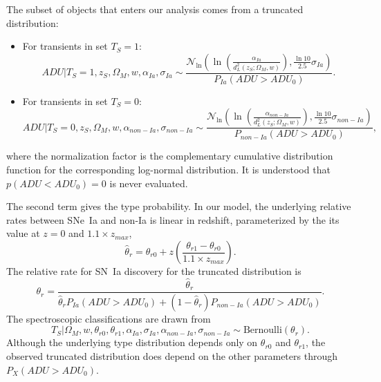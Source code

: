 \documentclass[preprint]{aastex}
\begin{document}
The subset of objects that enters our analysis comes from a truncated distribution:
\begin{itemize}
\item For transients in set $T_S=1$:
\begin{equation}
\mathit{ADU} | T_S=1, z_S, \Omega_M, w, \alpha_{Ia},\sigma_{Ia} \sim
\frac{\mathcal{N}_{\ln}\left(\ln{\left(\frac{\alpha_{Ia}}{d_L^2(z_S;\Omega_M, w)}\right)}, \frac{\ln{10}}{2.5}\sigma_{Ia}\right)}{P_{Ia}(\mathit{ADU} > \mathit{ADU}_0)}.
\label{adusnIa:eqn}
\end{equation}
\item For transients in set $T_S=0$:
\begin{equation}
\mathit{ADU} | T_S=0, z_S, \Omega_M, w, \alpha_{\mathit{non-Ia}},\sigma_{\mathit{non-Ia}}\sim 
\frac{\mathcal{N}_{\ln}\left(\ln{\left(\frac{\alpha_{\mathit{non-Ia}}}{d_L^2(z_S;\Omega_M, w)}\right)}, \frac{\ln{10}}{2.5}\sigma_{\mathit{non-Ia}}\right)}{P_{non-Ia}(\mathit{ADU} > \mathit{ADU}_0)},
\label{adunonIa:eqn}
\end{equation}
\end{itemize}
where the normalization factor is the complementary cumulative distribution function
for the corresponding log-normal distribution.
It is understood that $p(\mathit{ADU}<\mathit{ADU}_0)=0$ is never evaluated.

The second term gives the type probability. In our model,
the underlying relative rates between SNe~Ia and non-Ia is linear in redshift,
 parameterized by the
its value at $z=0$ and $1.1 \times z_{max}$, 
\begin{equation}
\hat{\theta}_{r}=\theta_{r0}+z\left(\frac{\theta_{r1}-\theta_{r0}}{1.1 \times z_{max}}\right).
\end{equation}
The relative rate for SN~Ia discovery for the truncated distribution is
\begin{equation}
\theta_{r}=\frac{\hat{\theta}_{r}}{\hat{\theta}_{r}P_{Ia}(\mathit{ADU} > \mathit{ADU}_0) + (1-\hat{\theta}_{r})P_{non-Ia}(\mathit{ADU} > \mathit{ADU}_0)}.
\end{equation}
The spectroscopic classifications are drawn from
\begin{equation}
T_S | \Omega_M, w, \theta_{r0}, \theta_{r1} , \alpha_{Ia},\sigma_{Ia}, \alpha_{\mathit{non-Ia}},\sigma_{\mathit{non-Ia}} \sim \text{Bernoulli}(\theta_r).
\end{equation}
Although the underlying type distribution depends only on $ \theta_{r0}$ and $ \theta_{r1}$,  
the observed truncated distribution does depend on the other parameters through 
$P_{X}(\mathit{ADU} > \mathit{ADU}_0)$.
\end{document}
